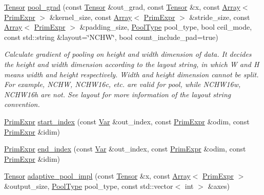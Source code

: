 \begin{DoxyCompactItemize}
\hyperlink{classtvm_1_1te_1_1Tensor}{Tensor} \hyperlink{namespacetopi_1_1nn_a4f915567f195ade4a17743a5e7654e88}{pool\+\_\+grad} (const \hyperlink{classtvm_1_1te_1_1Tensor}{Tensor} \&out\+\_\+grad, const \hyperlink{classtvm_1_1te_1_1Tensor}{Tensor} \&x, const \hyperlink{classtvm_1_1Array}{Array}$<$ \hyperlink{classtvm_1_1PrimExpr}{Prim\+Expr} $>$ \&kernel\+\_\+size, const \hyperlink{classtvm_1_1Array}{Array}$<$ \hyperlink{classtvm_1_1PrimExpr}{Prim\+Expr} $>$ \&stride\+\_\+size, const \hyperlink{classtvm_1_1Array}{Array}$<$ \hyperlink{classtvm_1_1PrimExpr}{Prim\+Expr} $>$ \&padding\+\_\+size, \hyperlink{namespacetopi_1_1nn_ac531cfce9c3a031fa25cfb6ed1f9b95b}{Pool\+Type} pool\+\_\+type, bool ceil\+\_\+mode, const std\+::string \&layout=\char`\"{}N\+C\+HW\char`\"{}, bool count\+\_\+include\+\_\+pad=true)
\begin{DoxyCompactList}\small\item\em Calculate gradient of pooling on height and width dimension of data. It decides the height and width dimension according to the layout string, in which \textquotesingle{}W\textquotesingle{} and \textquotesingle{}H\textquotesingle{} means width and height respectively. Width and height dimension cannot be split. For example, N\+C\+HW, N\+C\+H\+W16c, etc. are valid for pool, while N\+C\+H\+W16w, N\+C\+H\+W16h are not. See {\itshape layout} for more information of the layout string convention. \end{DoxyCompactList}\item 
\hyperlink{classtvm_1_1PrimExpr}{Prim\+Expr} \hyperlink{namespacetopi_1_1nn_a91b52c68356d23123474ebf10f9b0140}{start\+\_\+index} (const \hyperlink{classtvm_1_1tir_1_1Var}{Var} \&out\+\_\+index, const \hyperlink{classtvm_1_1PrimExpr}{Prim\+Expr} \&odim, const \hyperlink{classtvm_1_1PrimExpr}{Prim\+Expr} \&idim)
\item 
\hyperlink{classtvm_1_1PrimExpr}{Prim\+Expr} \hyperlink{namespacetopi_1_1nn_aadbaaec56f0b485262bf5199bbe3dcb3}{end\+\_\+index} (const \hyperlink{classtvm_1_1tir_1_1Var}{Var} \&out\+\_\+index, const \hyperlink{classtvm_1_1PrimExpr}{Prim\+Expr} \&odim, const \hyperlink{classtvm_1_1PrimExpr}{Prim\+Expr} \&idim)
\item 
\hyperlink{classtvm_1_1te_1_1Tensor}{Tensor} \hyperlink{namespacetopi_1_1nn_ad4f34df5cfa8dc75843116bc39f06066}{adaptive\+\_\+pool\+\_\+impl} (const \hyperlink{classtvm_1_1te_1_1Tensor}{Tensor} \&x, const \hyperlink{classtvm_1_1Array}{Array}$<$ \hyperlink{classtvm_1_1PrimExpr}{Prim\+Expr} $>$ \&output\+\_\+size, \hyperlink{namespacetopi_1_1nn_ac531cfce9c3a031fa25cfb6ed1f9b95b}{Pool\+Type} pool\+\_\+type, const std\+::vector$<$ int $>$ \&axes)

\end{DoxyCompactItemize}
